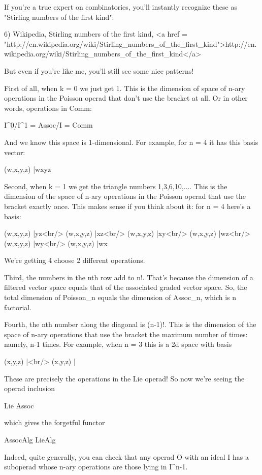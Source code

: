 If you're a true expert on combinatories, you'll instantly
recognize these as "Stirling numbers of the first kind":

6) Wikipedia, Stirling numbers of the first kind,
<a href = "http://en.wikipedia.org/wiki/Stirling_numbers_of_the_first_kind">http://en.wikipedia.org/wiki/Stirling_numbers_of_the_first_kind</a>

But even if you're like me, you'll still see some nice patterns!

First of all, when k = 0 we just get 1.  This is the dimension of
space of n-ary operations in the Poisson operad that don't use the
bracket at all.  Or in other words, operations in Comm:

I^{0}/I^{1} = Assoc/I = Comm

And we know this space is 1-dimensional.  For example, for n = 4 it
has this basis vector:

(w,x,y,z) |\to  wxyz

Second, when k = 1 we get the triangle numbers 1,3,6,10,....  This is
the dimension of the space of n-ary operations in the Poisson operad
that use the bracket exactly once.  This makes sense if you think
about it: for n = 4 here's a basis:

(w,x,y,z) |yz<br/>
(w,x,y,z) |xz<br/>
(w,x,y,z) |xy<br/>
(w,x,y,z) |wz<br/>
(w,x,y,z) |wy<br/>
(w,x,y,z) |wx

We're getting 4 choose 2 different operations.

Third, the numbers in the nth row add to n!.  That's because the
dimension of a filtered vector space equals that of the associated
graded vector space.  So, the total dimension of Poisson_{n}
equals the dimension of Assoc_{n}, which is n factorial.

Fourth, the nth number along the diagonal is (n-1)!.  This is the
dimension of the space of n-ary operations that use the bracket the
maximum number of times: namely, n-1 times.  For example, when n = 3
this is a 2d space with basis

(x,y,z) |<br/>
(x,y,z) |

These are precisely the operations in the Lie operad!  So now we're
seeing the operad inclusion

Lie \to  Assoc

which gives the forgetful functor

AssocAlg \to  LieAlg

Indeed, quite generally, you can check that any operad O with an ideal
I has a suboperad whose n-ary operations are those lying in I^{n-1}. 


